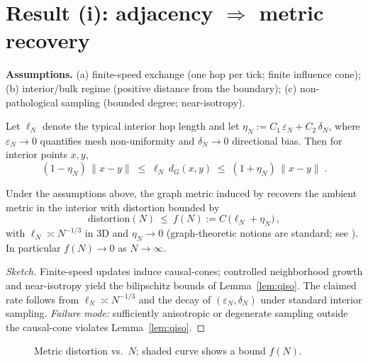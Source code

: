 \documentclass[11pt,a4paper]{article}
\begin{document}
\section{\texorpdfstring{Result (i): adjacency \(\Rightarrow\) metric recovery}{Result (i): adjacency → metric recovery}}

\textbf{Assumptions.} (a) finite-speed exchange (one hop per \gls{tick}; finite influence cone); (b) interior/bulk regime (positive distance from the boundary); (c) non-pathological sampling (bounded degree; near-isotropy).

\begin{lemma}\label{lem:qiso}
Let $\ell_N$ denote the typical interior hop length and let $\eta_N:=C_1\,\varepsilon_N + C_2\,\delta_N$, where $\varepsilon_N\!\to\!0$ quantifies mesh non-uniformity and $\delta_N\!\to\!0$ directional bias. Then for interior points $x,y$,
\smallskip
\begin{equation}\label{eq:qiso-bilip}
(1-\eta_N)\,\|x-y\| \;\le\; \ell_N\, d_G(x,y) \;\le\; (1+\eta_N)\,\|x-y\|\;.
\end{equation}
\end{lemma}

\begin{theorem}\label{thm:interior}
Under the assumptions above, the graph metric induced by  recovers the ambient metric in the interior with distortion bounded by
\smallskip
\begin{equation}\label{eq:distortion-bound}
\mathrm{distortion}(N)\ \le\ f(N):=C\,\big(\ell_N + \eta_N\big)\,,
\end{equation}
with $\ell_N\asymp N^{-1/3}$ in 3D and $\eta_N\to0$ (graph-theoretic notions are standard; see \cite{lovasz1993random}). In particular $f(N)\to0$ as $N\to\infty$.
\end{theorem}

\begin{proof}[Sketch]
Finite-speed updates induce \glspl{causal-cone}; controlled neighborhood growth and near-isotropy yield the bilipschitz bounds of Lemma~\ref{lem:qiso}. The claimed rate follows from $\ell_N\!\asymp\! N^{-1/3}$ and the decay of $(\varepsilon_N,\delta_N)$ under standard interior sampling. \emph{Failure mode:} sufficiently anisotropic or degenerate sampling outside the \gls{causal-cone} violates Lemma~\ref{lem:qiso}.
\end{proof}

\begin{figure}[t]
  \centering
  \caption{Metric distortion vs.\ $N$; shaded curve shows a bound $f(N)$.}
\end{figure}
\end{document}
